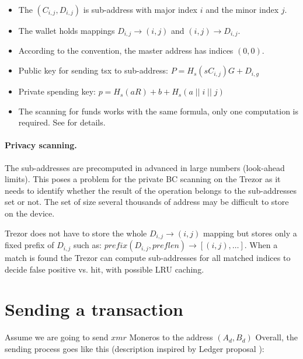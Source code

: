 \documentclass[]{article}
\begin{document}
\begin{itemize}
	\item The $(C_{i,j}, D_{i,j})$ is sub-address with major index $i$ and the minor index $j$.
	
	\item  The wallet holds mappings $D_{i,j} \rightarrow (i, j)$ and $(i, j) \rightarrow D_{i,j}$. 
	
	\item According to the convention, the master address has indices $(0, 0)$.
	
	\item Public key for sending tsx to sub-address: $P = H_s(sC_{i,j})G + D_{i,g}$
	
	\item Private spending key: $p = H_s(aR) + b + H_s(a \; || \; i \; || \; j)$
	
	\item The scanning for funds works with the same formula, only one computation is required. See \cite{mrl_006_subaddr} for details.
\end{itemize}


\paragraph{Privacy scanning.}
The sub-addresses are precomputed in advanced in large numbers (look-ahead limits). 
This poses a problem for the private BC scanning on the Trezor as it needs to identify whether the result of the operation belongs to the sub-addresses set or not. The set of size several thousands of address may be difficult to store on the device.

Trezor does not have to store the whole $D_{i,j} \rightarrow (i, j)$ mapping but stores only a fixed prefix of $D_{i,j}$ such as: 
$prefix(D_{i,j}, preflen) \rightarrow [(i, j), \dots]$. When a match is found the Trezor can compute sub-addresses for all matched indices to decide false positive vs. hit, with possible LRU caching.


\section{Sending a transaction}
Assume we are going to send $xmr$ Moneros to the address $(A_d, B_d)$
Overall, the sending process goes like this (description inspired by Ledger proposal \cite{ledger_doc}):
\end{document}
